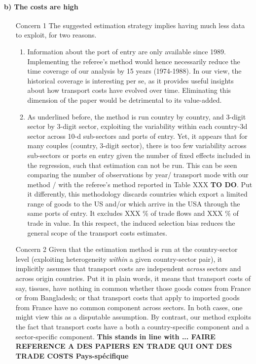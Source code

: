 \documentclass[a4paper,12pt]{article}
\begin{document}
\paragraph{b) The costs are high}
\begin{itemize}
\item[Concern 1] The suggested estimation strategy implies having much less data to exploit, for two reasons.
\begin{enumerate}
\item Information about the port of entry are only available since 1989. Implementing the referee's method would hence necessarily reduce the time coverage of our analysis by 15 years (1974-1988). In our view, the historical coverage is interesting per se, as it provides useful insights about how transport costs have evolved over time. Eliminating this dimension of the paper would be detrimental to its value-added.
\item As underlined before, the method is run country by country, and 3-digit sector by 3-digit sector, exploiting the variability within each country-3d sector across 10-d sub-sectors and ports of entry. Yet, it appears that for many couples (country, 3-digit sector), there is too few variability across sub-sectors or ports en entry given the number of fixed effects included in the regression, such that estimation can not be run. This can be seen comparing the number of observations by year/ transport mode with our method / with the referee's method reported in Table XXX \textbf{TO DO}. Put it differently, this methodology discards countries which export a limited range of goods to the US and/or which arrive in the USA through the same ports of entry. It excludes XXX \% of trade flows and XXX \% of trade in value. In this respect, the induced selection bias reduces the general scope of the transport costs estimates.

    \end{enumerate}
\item[Concern 2] Given that the estimation method is run at the country-sector level (exploiting heterogeneity \textit{within} a given country-sector pair), it implicitly assumes that transport costs are independent \textit{across} sectors and across origin countries. Put it in plain words, it means that transport costs of say, tissues, have nothing in common whether those goods comes from France or from Bangladesh; or that transport costs that apply to imported goods from France have no common component across sectors. In both cases, one might view this as a disputable assumption. By contrast, our method exploits the fact that transport costs have a both a country-specific component and a sector-specific component. \textbf{This stands in line with ...  FAIRE REFERENCE A DES PAPIERS EN TRADE QUI ONT DES TRADE COSTS Pays-spécifique}



\end{itemize}
\end{document}
